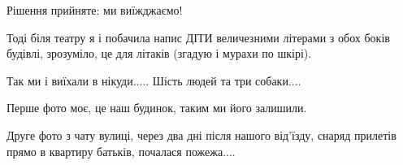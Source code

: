 Рішення прийняте: ми виїжджаємо! 

Тоді  біля театру я і побачила напис  ДІТИ величезними літерами з обох боків
будівлі, зрозуміло, це для літаків (згадую і мурахи по шкірі).

Так ми і виїхали в нікуди..... Шість людей та три собаки....

Перше фото моє, це наш будинок, таким ми його залишили.

Друге фото з чату вулиці, через  два дні після нашого від'їзду, снаряд прилетів
прямо в квартиру батьків, почалася пожежа....

